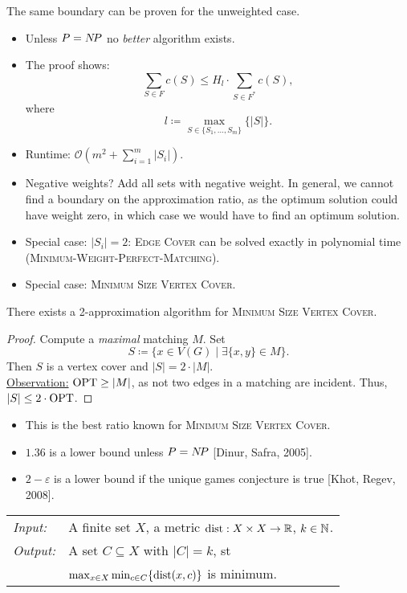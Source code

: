 \documentclass[../skript.tex]{subfiles}
\begin{document}
The same boundary can be proven for the unweighted case. \\
\begin{remark}
\begin{itemize}
\item Unless $P = N \! P$ no \textit{better} algorithm exists.
\item The proof shows:
\[
	\sum_{S \in F} c(S) \leq H_l \cdot \sum_{S \in F^*} c(S),
\]
where
\[
	l \coloneqq \max_{S \in \{S_1, \ldots, S_m\}} \{ |S| \}.
\]
\item Runtime: $\mathcal{O}(m^2 + \sum_{i=1}^m |S_i|)$.
\item Negative weights? Add all sets with negative weight. In general, we cannot find a boundary on the approximation ratio, as the optimum solution could have weight zero, in which case we would have to find an optimum solution.
\item Special case: $|S_i| = 2$: \textsc{Edge Cover} can be solved exactly in polynomial time (\textsc{Minimum-Weight-Perfect-Matching}).
\item Special case: \textsc{Minimum Size Vertex Cover}.
\end{itemize}
\end{remark}
\begin{theorem} %
There exists a 2-approximation algorithm for \textsc{Minimum Size Vertex Cover}.
\end{theorem}
\begin{proof}
Compute a \textit{maximal} matching $M$. Set
\[
	S \coloneqq \{ x \in V(G) \mid \exists \{ x, y\} \in M\}.
\]
Then $S$ is a vertex cover and $|S| = 2 \cdot |M|$. \\
\underline{Observation:} $\operatorname{OPT} \geq |M|$, as not two edges in a matching are incident.
Thus, $|S| \leq 2 \cdot \operatorname{OPT}$.
\end{proof}
\begin{remark}
\begin{itemize}
\item This is the best ratio known for \textsc{Minimum Size Vertex Cover}.
\item $1.36$ is a lower bound unless $P = N \! P$ [Dinur, Safra, 2005].
\item $2-\varepsilon$ is a lower bound if the unique games conjecture is true [Khot, Regev, 2008].
\end{itemize}
\end{remark}
\begin{problem}[$k$-Center]
\begin{tabular}{@{}ll}
\textit{Input:} & A finite set $X$, a metric $\operatorname*{dist} : X \times X \to \mathbb{R}$, $k \in \mathbb{N}$. \\
\textit{Output:} & A set $C \subseteq X$ with $|C| = k$, \ac{st} \\
&$\max_{x \in X} \min_{c \in C} \{\operatorname*{dist}(x, c)\}$ is minimum.
\end{tabular}
\end{problem}
\end{document}

